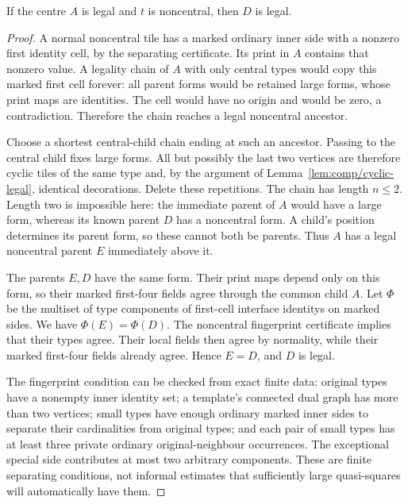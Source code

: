 \begin{lemma}
\label{lem:comp/noncentral-legal}
If the centre $A$ is legal and $t$ is noncentral, then $D$ is legal.
\end{lemma}
\begin{proof}
A normal noncentral tile has a marked ordinary inner side with a nonzero
first identity cell, by the separating certificate. Its print in $A$
contains that nonzero value. A legality chain of $A$ with only central
types would copy this marked first cell forever: all parent forms would
be retained large forms, whose print maps are identities. The cell would
have no origin and would be zero, a contradiction. Therefore the chain
reaches a legal noncentral ancestor.

Choose a shortest central-child chain ending at such an ancestor. Passing
to the central child fixes large forms. All but possibly the last two
vertices are therefore cyclic tiles of the same type and, by the argument
of Lemma~\ref{lem:comp/cyclic-legal}, identical decorations. Delete these
repetitions. The chain has length $n\le2$. Length two is impossible here:
the immediate parent of $A$ would have a large form, whereas its known
parent $D$ has a noncentral form. A child's position determines its parent
form, so these cannot both be parents. Thus $A$ has a legal noncentral
parent $E$ immediately above it.

The parents $E,D$ have the same form. Their print maps depend only on this
form, so their marked first-four fields agree through the common child $A$.
Let $\Phi$ be the multiset of type components of first-cell interface identitys
on marked sides. We have $\Phi(E)=\Phi(D)$. The noncentral fingerprint
certificate implies that their types agree. Their local fields then agree
by normality, while their marked first-four fields already agree. Hence
$E=D$, and $D$ is legal.

The fingerprint condition can be checked from exact finite data: original
types have a nonempty inner identity set; a template's connected dual graph
has more than two vertices; small types have enough ordinary marked inner
sides to separate their cardinalities from original types; and each pair
of small types has at least three private ordinary original-neighbour
occurrences. The exceptional special side contributes at most two arbitrary
components. These are finite separating conditions, not informal estimates
that sufficiently large quasi-squares will automatically have them.
\end{proof}

